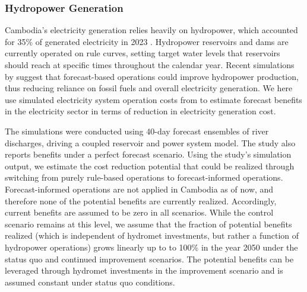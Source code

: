 \documentclass[
  final,
  10pt,
  letterpaper,
  english,
]{article}
\begin{document}
\subsubsection{Hydropower Generation}
\label{sec:methods_hydropower}
Cambodia's electricity generation relies heavily on hydropower, which accounted
for 35\% of generated electricity in 2023
\parencite{iea2023energy_mix_cambodia}. Hydropower reservoirs and dams are
currently operated on rule curves, setting target water levels that reservoirs
should reach at specific times throughout the calendar year. Recent simulations
by \cite{koh_evaluating_2024} suggest that forecast-based operations could
improve hydropower production, thus reducing reliance on fossil fuels and
overall electricity generation. We here use simulated electricity system
operation costs from \cite{koh_evaluating_2024} to estimate forecast benefits in
the electricity sector in terms of reduction in electricity generation cost.

The simulations were conducted using 40-day forecast ensembles of river
discharges, driving a coupled reservoir and power system model. The study also
reports benefits under a perfect forecast scenario. Using the study's simulation
output, we estimate the cost reduction potential that could be realized through
switching from purely rule-based operations to forecast-informed operations.
Forecast-informed operations are not applied in Cambodia as of now, and
therefore none of the potential benefits are currently realized. Accordingly,
current benefits are assumed to be zero in all scenarios. While the control
scenario remains at this level, we assume that the fraction of potential
benefits realized (which is independent of hydromet investments, but rather a
function of hydropower operations) grows linearly up to to 100\% in the year
2050 under the status quo and continued improvement scenarios. The potential
benefits can be leveraged through hydromet investments in the improvement
scenario and is assumed constant under status quo conditions.
\end{document}

